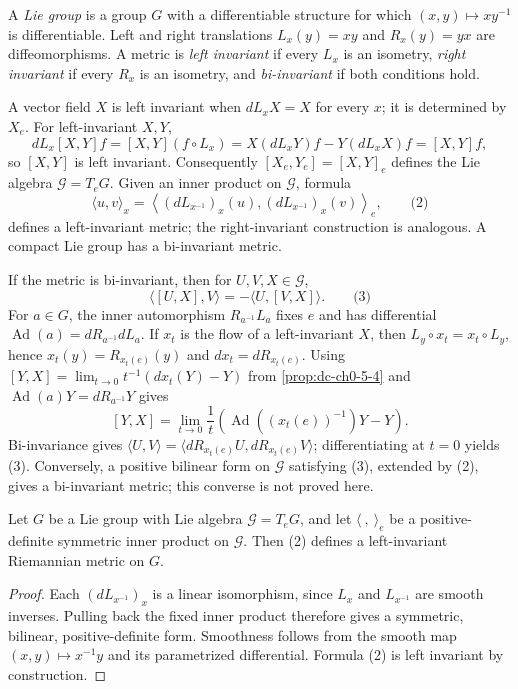 \begin{example}
  \label{ex:dc-ch1-2-6}
  \notready
  A \emph{Lie group} is a group $G$ with a differentiable structure for which
  $(x,y)\mapsto xy^{-1}$ is differentiable. Left and right translations
  $L_x(y)=xy$ and $R_x(y)=yx$ are diffeomorphisms. A metric is \emph{left invariant}
  if every $L_x$ is an isometry, \emph{right invariant} if every $R_x$ is an
  isometry, and \emph{bi-invariant} if both conditions hold.

  A vector field $X$ is left invariant when $dL_xX=X$ for every $x$; it is determined
  by $X_e$.
  \sketch
  For left-invariant $X,Y$,
  $$
  dL_x[X,Y]f=[X,Y](f\circ L_x)=X(dL_xY)f-Y(dL_xX)f=[X,Y]f,
  $$
  so $[X,Y]$ is left invariant. Consequently $[X_e,Y_e]=[X,Y]_e$ defines the Lie
  algebra $\mathcal{G}=T_eG$. Given an inner product on $\mathcal{G}$, formula
  $$
  \langle u,v\rangle_x=
  \left\langle(dL_{x^{-1}})_x(u),(dL_{x^{-1}})_x(v)\right\rangle_e,
  \qquad\text{(2)}
  $$
  defines a left-invariant metric; the right-invariant construction is analogous.
  A compact Lie group has a bi-invariant metric.

  If the metric is bi-invariant, then for $U,V,X\in\mathcal{G}$,
  $$
  \langle[U,X],V\rangle=-\langle U,[V,X]\rangle.\qquad\text{(3)}
  $$
  \sketch
  For $a\in G$, the inner automorphism $R_{a^{-1}}L_a$ fixes $e$ and has
  differential $\operatorname{Ad}(a)=dR_{a^{-1}}dL_a$. If $x_t$ is the flow of a
  left-invariant $X$, then $L_y\circ x_t=x_t\circ L_y$, hence
  $x_t(y)=R_{x_t(e)}(y)$ and $dx_t=dR_{x_t(e)}$. Using
  $[Y,X]=\lim_{t\to0}t^{-1}(dx_t(Y)-Y)$ from
  \cref{prop:dc-ch0-5-4} and
  $\operatorname{Ad}(a)Y=dR_{a^{-1}}Y$ gives
  $$
  [Y,X]=\lim_{t\to0}\frac{1}{t}
  \left(\operatorname{Ad}((x_t(e))^{-1})Y-Y\right).
  $$
  Bi-invariance gives
  $\langle U,V\rangle=\langle dR_{x_t(e)}U,dR_{x_t(e)}V\rangle$; differentiating at
  $t=0$ yields (3). Conversely, a positive bilinear form on $\mathcal{G}$ satisfying
  (3), extended by (2), gives a bi-invariant metric; this converse is not proved here.
\end{example}

\begin{proposition}
  \label{prop:dc-ch1-2-6-leftinv}
  \leanok
  Let $G$ be a Lie group with Lie algebra $\mathcal{G}=T_eG$, and let
  $\langle\ ,\ \rangle_e$ be a positive-definite symmetric inner product on
  $\mathcal{G}$. Then (2) defines a left-invariant Riemannian metric on $G$.
\end{proposition}
\begin{proof}
  \leanok
  \sketch
  Each $(dL_{x^{-1}})_x$ is a linear isomorphism, since $L_x$ and $L_{x^{-1}}$
  are smooth inverses. Pulling back the fixed inner product therefore gives a
  symmetric, bilinear, positive-definite form. Smoothness follows from the smooth
  map $(x,y)\mapsto x^{-1}y$ and its parametrized differential. Formula (2) is
  left invariant by construction.
\end{proof}

